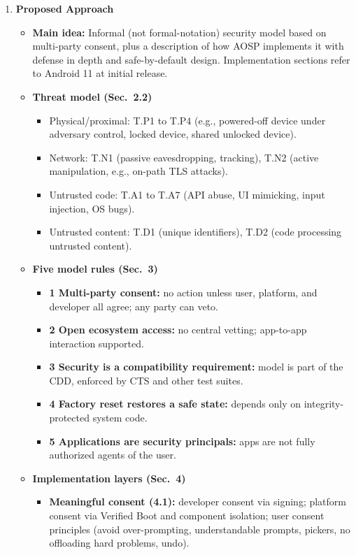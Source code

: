 \documentclass[11pt,a4paper]{article}
\newcommand{\entrypart}[1]{\textbf{\color{accent}#1}\par\vspace{2pt}}
\begin{document}
\begin{enumerate}
    \item \entrypart{Proposed Approach}

    \begin{itemize}[leftmargin=*,itemsep=1pt,topsep=2pt]
        \item \textbf{Main idea:} Informal (not formal-notation) security model based on multi-party consent, plus a description of how AOSP implements it with defense in depth and safe-by-default design. Implementation sections refer to Android 11 at initial release.
        \item \textbf{Threat model (Sec.~2.2)}
        \begin{itemize}[itemsep=0pt]
            \item Physical/proximal: T.P1 to T.P4 (e.g., powered-off device under adversary control, locked device, shared unlocked device).
            \item Network: T.N1 (passive eavesdropping, tracking), T.N2 (active manipulation, e.g., on-path TLS attacks).
            \item Untrusted code: T.A1 to T.A7 (API abuse, UI mimicking, input injection, OS bugs).
            \item Untrusted content: T.D1 (unique identifiers), T.D2 (code processing untrusted content).
        \end{itemize}
        \item \textbf{Five model rules (Sec.~3)}
        \begin{itemize}[itemsep=0pt]
            \item \textbf{1 Multi-party consent:} no action unless user, platform, and developer all agree; any party can veto.
            \item \textbf{2 Open ecosystem access:} no central vetting; app-to-app interaction supported.
            \item \textbf{3 Security is a compatibility requirement:} model is part of the CDD, enforced by CTS and other test suites.
            \item \textbf{4 Factory reset restores a safe state:} depends only on integrity-protected system code.
            \item \textbf{5 Applications are security principals:} apps are not fully authorized agents of the user.
        \end{itemize}
        \item \textbf{Implementation layers (Sec.~4)}
        \begin{itemize}[itemsep=0pt]
            \item \textbf{Meaningful consent (4.1):} developer consent via signing; platform consent via Verified Boot and component isolation; user consent principles (avoid over-prompting, understandable prompts, pickers, no offloading hard problems, undo).

\end{itemize}
\end{itemize}
\end{enumerate}
\end{document}
